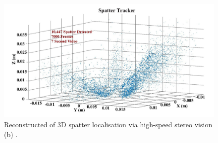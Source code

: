 \begin{figure}
    \centering
    \label{fig:barretspatter}
    \includegraphics[scale=0.3]{Images/splatter.png}
    \caption[3D spatter reconstruction.]{Reconstructed of 3D spatter localisation via high-speed stereo vision (b) \cite{barrett_statistical_2019}.}
\end{figure}
